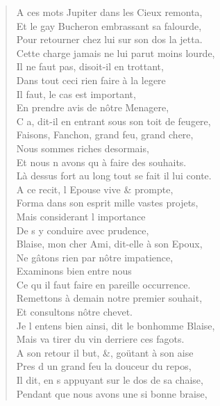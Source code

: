 \documentclass[14pt,a4paper]{memoir}
\begin{document}
{{\begin{otherlanguage}{french}
\begin{verse}
A ces mots Jupiter dans les Cieux remonta, \\
Et le gay Bucheron embrassant sa falourde, \\
Pour retourner chez lui sur son dos la jetta. \\
Cette charge jamais ne lui parut moins lourde, \\
\vin Il ne faut pas, disoit-il en trottant, \\
\vin Dans tout ceci rien faire à la legere \\
\vin Il faut, le cas est important, \\
En prendre avis de nôtre Menagere, \\
C\textquotesingle{} a, dit-il en entrant sous son toit de feugere, \\
\vin Faisons, Fanchon, grand feu, grand\textquotesingle{} chere, \\
\vin Nous sommes riches desormais, \\
\vin Et nous n\textquotesingle{} avons qu\textquotesingle{} à faire des souhaits. \\
Là dessus fort au long tout se fait il lui conte. \\
\vin A ce recit, l\textquotesingle{} Epouse vive \& prompte, \\
Forma dans son esprit mille vastes projets, \\
\vin Mais considerant l\textquotesingle{} importance \\
\vin De s\textquotesingle{} y conduire avec prudence, \\
Blaise, mon cher Ami, dit-elle à son Epoux, \\
\vin Ne gâtons rien par nôtre impatience, \\
\vin Examinons bien entre nous \\
\vin Ce qu\textquotesingle{} il faut faire en pareille occurrence. \\
Remettons à demain notre premier souhait, \\
\vin Et consultons nôtre chevet. \\
Je l\textquotesingle{} entens bien ainsi, dit le bonhomme Blaise, \\
Mais va tirer du vin derriere ces fagots. \\
A son retour il but, \&, goütant à son aise \\
\vin Pres d\textquotesingle{} un grand feu la douceur du repos, \\
Il dit, en s\textquotesingle{} appuyant sur le dos de sa chaise, \\
Pendant que nous avons une si bonne braise, \\

\end{verse}
\end{otherlanguage}}}
\end{document}
